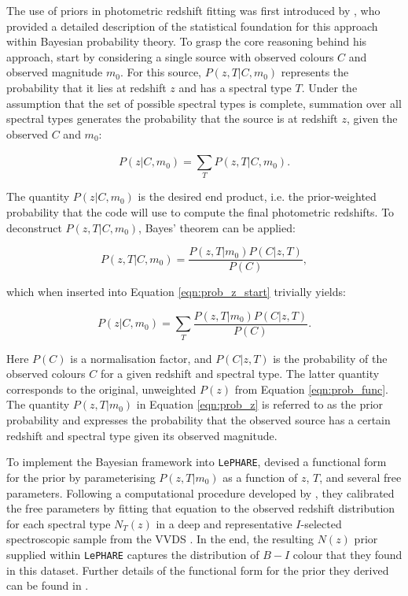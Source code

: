  

The use of priors in photometric redshift fitting was first introduced by \cite{2000ApJ...536..571B}, who provided a detailed description of the statistical foundation for this approach within Bayesian probability theory. To grasp the core reasoning behind his approach, start by considering a single source with observed colours $C$ and observed magnitude $m_0$. For this source, $P(z, T | C, m_{0})$ represents the probability that it lies at redshift $z$ and has a spectral type $T$. Under the assumption that the set of possible spectral types is complete, summation over all spectral types generates the probability that the source is at redshift $z$, given the observed $C$ and $m_0$:

\begin{equation}
P(z | C, m_{0}) = \sum_{T}^{}{P(z,T | C, m_{0})}.\label{eqn:prob_z_start}
\end{equation}

\noindent The quantity $P(z | C, m_{0})$ is the desired end product, i.e. the prior-weighted probability that the code will use to compute the final photometric redshifts. To deconstruct $P(z,T | C, m_{0})$, Bayes' theorem can be applied:

\begin{equation}
P(z,T | C, m_{0}) = \frac{P(z, T | m_{0})P(C|z, T)}{P(C)}, \label{eqn:bayes_theorem}
\end{equation}

\noindent which when inserted into Equation \ref{eqn:prob_z_start} trivially yields:

\begin{equation}
P(z | C, m_{0}) = \sum_{T}^{}{\frac{P(z, T | m_{0})P(C|z, T)}{P(C)}}.\label{eqn:prob_z} 
\end{equation}

\noindent Here $P(C)$ is a normalisation factor, and $P(C|z, T)$ is the probability of the observed colours $C$ for a given redshift and spectral type. The latter quantity corresponds to the original, unweighted $P(z)$ from Equation \ref{eqn:prob_func}. The quantity $P(z, T | m_{0})$ in Equation \ref{eqn:prob_z} is referred to as the prior probability and expresses the probability that the observed source has a certain redshift and spectral type given its observed magnitude. \par


To implement the Bayesian framework into \texttt{LePHARE}, \cite{2006A&A...457..841I} devised a functional form for the prior by parameterising $P(z,T|m_{0})$ as a function of $z$, $T$, and several free parameters. Following a computational procedure developed by \cite{2000ApJ...536..571B}, they calibrated the free parameters by fitting that equation to the observed redshift distribution for each spectral type $N_T(z)$ in a deep and representative $I$-selected spectroscopic sample from the VVDS \citep{2005A&A...439..845L}. In the end, the resulting $N(z)$ prior supplied within \texttt{LePHARE} captures the distribution of $B-I$ colour that they found in this dataset. Further details of the functional form for the prior they derived can be found in \cite{2006A&A...457..841I}.\par


